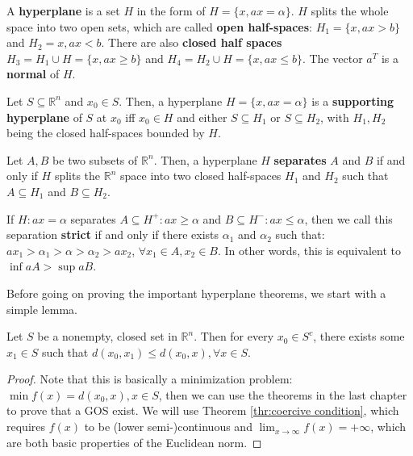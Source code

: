 \begin{definition}
  A \textbf{hyperplane} is a set \( H \) in the form of \( H = \{x, ax =
  \alpha\}   \). \( H \) splits the whole space into two open sets, which are
  called \textbf{open half-spaces}: \( H_{1} = \{x, ax > b\}   \) and \( H_{2}
  = {x, ax < b} \). There are also \textbf{closed half spaces} \( H_{3} = H_{1}
  \cup H =
  \{x, ax \ge  b\}  \) and \( H_{4} = H_{2} \cup  H = \{x, ax \le  b\}   \). The
  vector \( a^{T} \) is a \textbf{normal} of \( H \).

  Let \( S \subseteq \mathbb{R}^{n} \) and \( x_{0} \in S \). Then, a hyperplane
  \( H = \{x, ax = \alpha\}   \) is a \textbf{supporting hyperplane} of \( S \)
  at \( x_{0} \) iff \( x_{0} \in H \) and either \( S \subseteq H_{1} \) or \(
  S \subseteq H_{2}\), with \( H_{1}, H_{2} \) being the closed half-spaces
  bounded by \( H \).

  Let \( A, B \) be two subsets of \( \mathbb{R}^{n} \). Then, a hyperplane \( H
  \) \textbf{separates} \( A \) and \( B \) if and only if \( H \) splits the \(
  \mathbb{R}^{n}\) space into two closed half-spaces \( H_{1} \) and \( H_{2} \)
  such that \( A \subseteq H_{1} \) and \( B \subseteq H_{2} \).

  If \( H: ax = \alpha \) separates \( A \subseteq H^{+}: ax \ge  \alpha \) and
  \( B \subseteq H^{-}: ax \le \alpha \), then we call this separation
  \textbf{strict} if and only if there exists \( \alpha_{1} \) and \( \alpha_{2}
  \) such that: \( ax_{1} > \alpha_{1} > \alpha > \alpha_{2} > ax_{2} \), \(
  \forall x_{1} \in A, x_{2} \in B \). In other words, this is equivalent to \(
  \inf aA > \sup aB\).
\end{definition}

Before going on proving the important hyperplane theorems, we start with a
simple lemma.

\begin{lemma}
\label{lem:Existence of closest element}
  Let \( S \) be a nonempty, closed set in \( \mathbb{R}^{n} \).
  Then for every \( x_{0} \in S^{c} \), there exists some \( x_{1} \in S \)
  such that \( d(x_{0}, x_{1}) \le d(x_{0}, x), \forall x \in S \).
\end{lemma}

\begin{proof}
  Note that this is basically a minimization problem: \( \min f(x) = d(x_{0}, x), x \in
  S\), then we can use the theorems in the last chapter to prove that a GOS
  exist. We will use Theorem \ref{thr:coercive condition}, which requires \(
  f(x) \) to be (lower semi-)continuous and \( \lim_{x \to \infty} f(x) =
  +\infty \), which are both basic properties of the Euclidean norm.
\end{proof}

